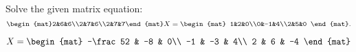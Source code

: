 
\begin{Exercise}[
name={},
title={}, 
difficulty=0,
origin={\cite{MH}}]
Solve the given matrix equation:
\[\begin{mat}2&6&6\\2&7&6\\2&7&7\end{mat}X=\begin{mat}
1&2&0\\0&-1&4\\2&5&0
\end{mat}.
\]
\end{Exercise}

\begin{Answer}
$X=\begin{mat}
-\frac52 & -8 & 0\\
-1 & -3 & 4\\
2 & 6 & -4
\end{mat}$
\end{Answer}
